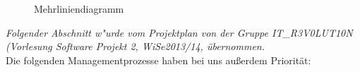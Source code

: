 \documentclass[fontsize=12pt,paper=a4,twoside]{scrartcl}
\begin{document}
\begin{figure}[h!]
\caption{Mehrliniendiagramm}
\label{Bild:image}
\end{figure}

\newpage
\textit{Folgender Abschnitt w"urde vom Projektplan von der Gruppe IT\_R3V0LUT10N (Vorlesung Software Projekt 2, WiSe2013/14, übernommen.}\\
Die folgenden Managementprozesse haben bei uns außerdem Priorität:
 \\
\end{document}
